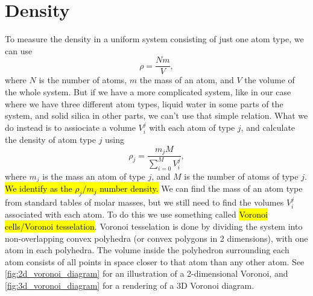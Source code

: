\section{Density}
To measure the density in a uniform system consisting of just one atom type, we can use
\[
    \rho = \frac{Nm}{V},
\]
where $N$ is the number of atoms, $m$ the mass of an atom, and $V$ the volume of the whole system. But if we have a more complicated system, like in our case where we have three different atom types, liquid water in some parts of the system, and solid silica in other parts, we can't use that simple relation. What we do instead is to assiociate a volume $V_i^j$ with each atom of type $j$, and calculate the density of atom type $j$ using
\[
    \rho_j = \dfrac{m_jM}{\sum_{i=0}^M V_i^j},
\]
where $m_j$ is the mass an atom of type $j$, and $M$ is the number of atoms of type $j$. \hl{We identify as the $\rho_j/m_j$ number density.} We can find the mass of an atom type from standard tables of molar masses, but we still need to find the volumes $V_i^j$ associated with each atom. To do this we use something called \hl{Voronoi cells/Voronoi tesselation}. Voronoi tesselation is done by dividing the system into non-overlapping convex polyhedra (or convex polygons in 2 dimensions), with one atom in each polyhedra. The volume inside the polyhedron surrounding each atom consists of all points in space closer to that atom than any other atom. See \cref{fig:2d_voronoi_diagram} for an illustration of a 2-dimensional Voronoi, and \cref{fig:3d_voronoi_diagram} for a rendering of a 3D Voronoi diagram.
%
